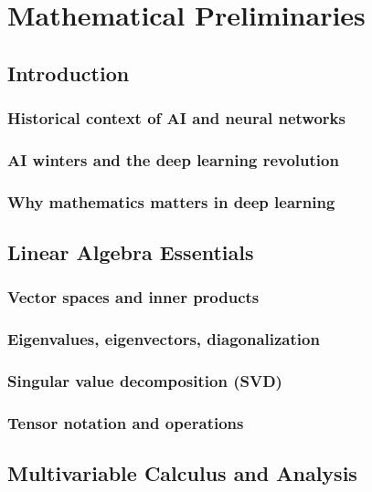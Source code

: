 
\frontmatter
\tableofcontents

\mainmatter

\part{Mathematical Preliminaries}

\chapter{Introduction}
\section{Historical context of AI and neural networks}
\section{AI winters and the deep learning revolution}
\section{Why mathematics matters in deep learning}

\chapter{Linear Algebra Essentials}
\section{Vector spaces and inner products}
\section{Eigenvalues, eigenvectors, diagonalization}
\section{Singular value decomposition (SVD)}
\section{Tensor notation and operations}

\chapter{Multivariable Calculus and Analysis}
